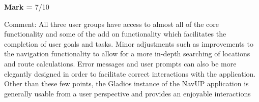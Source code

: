 \documentclass[english]{article}
\begin{document}
	\textbf{Mark =} 7/10 \newline
	
		Comment:  All three user groups have access to almost all of the core functionality and some of the add on functionality which facilitates the completion of user goals and tasks. Minor adjustments such as improvements to the navigation functionality to allow for a more in-depth searching of locations and route calculations. Error messages and user prompts can also be more elegantly designed in order to facilitate correct interactions with the application. Other than these few points, the Gladios instance of the NavUP application is generally usable from a user perspective and provides an enjoyable interactions 


%		
%		
%		
%		
%		
%
%		
%		
%		
\end{document}
